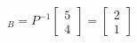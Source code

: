 \documentclass[preview]{standalone}
\begin{document}
\begin{align*}
[\vec{x}]_B = P^{-1} \begin{bmatrix} 5 \\ 4 \end{bmatrix} = \begin{bmatrix} 2 \\ 1 \end{bmatrix}
\end{align*}
\end{document}
